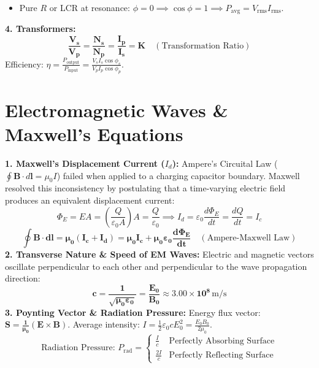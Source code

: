 \documentclass[10pt,a4paper]{article}
\begin{document}
\begin{formulabox}
\begin{itemize}
  \item Pure $R$ or LCR at resonance: $\phi = 0 \implies \cos\phi = 1 \implies P_{\text{avg}} = V_{\text{rms}} I_{\text{rms}}$.
\end{itemize}
\textbf{4. Transformers:}
\begin{equation}
  \mathbf{\frac{V_s}{V_p} = \frac{N_s}{N_p} = \frac{I_p}{I_s} = K} \quad (\text{Transformation Ratio})
\end{equation}
Efficiency: $\eta = \frac{P_{\text{output}}}{P_{\text{input}}} = \frac{V_s I_s \cos\phi_s}{V_p I_p \cos\phi_p}$.
\end{formulabox}

\section{Electromagnetic Waves \& Maxwell's Equations}

\begin{conceptbox}
\textbf{1. Maxwell's Displacement Current ($I_d$):}
Ampere's Circuital Law ($\oint \mathbf{B}\cdot d\mathbf{l} = \mu_0 I$) failed when applied to a charging capacitor boundary. Maxwell resolved this inconsistency by postulating that a time-varying electric field produces an equivalent displacement current:
\begin{equation}
  \Phi_E = E A = \left(\frac{Q}{\varepsilon_0 A}\right) A = \frac{Q}{\varepsilon_0} \implies I_d = \varepsilon_0 \frac{d\Phi_E}{dt} = \frac{dQ}{dt} = I_c
\end{equation}
\begin{equation}
  \mathbf{\oint \mathbf{B}\cdot d\mathbf{l} = \mu_0 (I_c + I_d) = \mu_0 I_c + \mu_0 \varepsilon_0 \frac{d\Phi_E}{dt}} \quad (\text{Ampere-Maxwell Law})
\end{equation}
\textbf{2. Transverse Nature \& Speed of EM Waves:}
Electric and magnetic vectors oscillate perpendicular to each other and perpendicular to the wave propagation direction:
\begin{equation}
  \mathbf{c = \frac{1}{\sqrt{\mu_0 \varepsilon_0}} = \frac{E_0}{B_0} \approx 3.00 \times 10^8\,\mathrm{m/s}}
\end{equation}
\textbf{3. Poynting Vector \& Radiation Pressure:}
Energy flux vector: $\mathbf{S = \frac{1}{\mu_0}(\mathbf{E} \times \mathbf{B})}$. Average intensity: $I = \frac{1}{2}\varepsilon_0 c E_0^2 = \frac{E_0 B_0}{2\mu_0}$.
\begin{equation}
  \text{Radiation Pressure: } P_{\text{rad}} = \begin{cases} \frac{I}{c} & \text{Perfectly Absorbing Surface} \\ \frac{2I}{c} & \text{Perfectly Reflecting Surface} \end{cases}
\end{equation}
\end{conceptbox}
\end{document}
